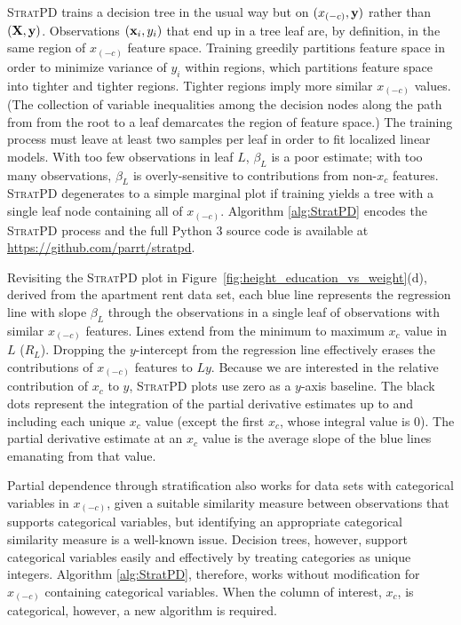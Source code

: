 \documentclass[12pt]{article}
\newcommand{\figref}[1]{Figure~\ref{#1}}
\newcommand{\spd}{\fontfamily{cmr}\textsc{\small StratPD}}
\newcommand{\xnc}{$x_{(-c)}$}
\begin{document}
\spd{} trains a decision tree in the usual way but on $(x_{(-c)}, {\bf y})$ rather than $({\bf X}, {\bf y})$. Observations $({\bf x}_{i}, y_i)$ that end up in a tree leaf are, by definition, in the same region of \xnc{} feature space. Training greedily partitions feature space in order to minimize variance of $y_i$ within regions, which partitions feature space into tighter and tighter regions.  Tighter regions imply more similar \xnc{} values. (The collection of variable inequalities among the decision nodes along the path from from the root to a leaf demarcates the region of feature space.)  The training process must leave at least two samples per leaf in order to fit localized linear models. With too few observations in leaf $L$, $\beta_L$ is a poor estimate; with too many observations, $\beta_L$ is overly-sensitive to contributions from non-$x_c$ features. \spd{} degenerates to a simple marginal plot if training yields a tree with a single leaf node containing all of \xnc{}.  Algorithm \ref{alg:StratPD} encodes the \spd{} process and the full Python 3 source code is available at {\small \url{https://github.com/parrt/stratpd}}.

Revisiting the \spd{} plot in \figref{fig:height_education_vs_weight}(d), derived from the apartment rent data set, each blue line represents the regression line with slope $\beta_L$ through the observations in a single leaf of observations with similar \xnc{} features. Lines extend from the minimum to maximum $x_c$ value in $L$ ($R_L$). Dropping the $y$-intercept from the regression line effectively erases the contributions of \xnc{} features to $Ly$. Because we are interested in the relative contribution of $x_c$ to $y$, \spd{} plots use zero as a $y$-axis baseline. The black dots represent the integration of the partial derivative estimates up to and including each unique $x_c$ value (except the first $x_c$, whose integral value is 0). The partial derivative estimate at an $x_c$ value is the average slope of the blue lines emanating from that value.  

Partial dependence through stratification also works for data sets with categorical variables in \xnc{}, given a suitable similarity measure between observations that supports categorical variables, but identifying an appropriate categorical similarity measure is a well-known issue.  Decision trees, however, support categorical variables easily and effectively by treating categories as unique integers. Algorithm \ref{alg:StratPD}, therefore, works without modification for \xnc{} containing categorical variables. When the column of interest, $x_c$, is categorical, however, a new algorithm is required.
\end{document}
